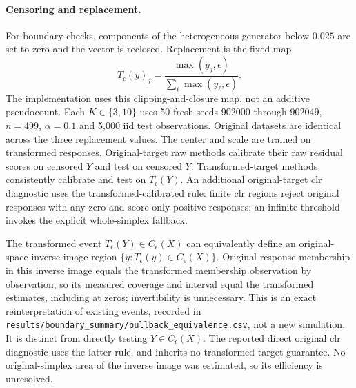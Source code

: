 \paragraph{Censoring and replacement.}
For boundary checks, components of the heterogeneous generator below $0.025$ are set to zero and the vector is reclosed. Replacement is the fixed map
\begin{equation}
 T_\epsilon(y)_j=\frac{\max(y_j,\epsilon)}{\sum_\ell\max(y_\ell,\epsilon)}.
 \label{eq:replacement}
\end{equation}
The implementation uses this clipping-and-closure map, not an additive pseudocount. Each $K\in\{3,10\}$ uses 50 fresh seeds 902000 through 902049, $n=499$, $\alpha=0.1$ and 5,000 iid test observations. Original datasets are identical across the three replacement values. The center and scale are trained on transformed responses. Original-target raw methods calibrate their raw residual scores on censored $Y$ and test on censored $Y$. Transformed-target methods consistently calibrate and test on $T_\epsilon(Y)$. An additional original-target clr diagnostic uses the transformed-calibrated rule: finite clr regions reject original responses with any zero and score only positive responses; an infinite threshold invokes the explicit whole-simplex fallback.

The transformed event $T_\epsilon(Y)\in C_\epsilon(X)$ can equivalently define an original-space inverse-image region $\{y:T_\epsilon(y)\in C_\epsilon(X)\}$. Original-response membership in this inverse image equals the transformed membership observation by observation, so its measured coverage and interval equal the transformed estimates, including at zeros; invertibility is unnecessary. This is an exact reinterpretation of existing events, recorded in \texttt{results/boundary\_summary/pullback\_equivalence.csv}, not a new simulation. It is distinct from directly testing $Y\in C_\epsilon(X)$. The reported direct original clr diagnostic uses the latter rule, and inherits no transformed-target guarantee. No original-simplex area of the inverse image was estimated, so its efficiency is unresolved.
